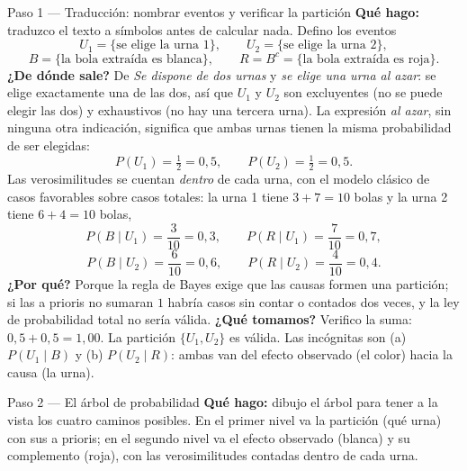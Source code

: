 \documentclass[11pt]{article}
\begin{document}
\begin{sol}

\begin{paso}{Paso 1 --- Traducción: nombrar eventos y verificar la partición}
\textbf{Qué hago:} traduzco el texto a símbolos antes de calcular nada. Defino los eventos
\[
U_1=\{\text{se elige la urna 1}\},\qquad U_2=\{\text{se elige la urna 2}\},
\]
\[
B=\{\text{la bola extraída es blanca}\},\qquad R=B^{c}=\{\text{la bola extraída es roja}\}.
\]
\textbf{¿De dónde sale?} De \emph{Se dispone de dos urnas} y \emph{se elige una urna al azar}: se elige exactamente una de las dos, así que $U_1$ y $U_2$ son excluyentes (no se puede elegir las dos) y exhaustivos (no hay una tercera urna). La expresión \emph{al azar}, sin ninguna otra indicación, significa que ambas urnas tienen la misma probabilidad de ser elegidas:
\[
P(U_1)=\tfrac12=0,5,\qquad P(U_2)=\tfrac12=0,5.
\]
Las verosimilitudes se cuentan \emph{dentro} de cada urna, con el modelo clásico de casos favorables sobre casos totales: la urna 1 tiene $3+7=10$ bolas y la urna 2 tiene $6+4=10$ bolas,
\[
P(B\mid U_1)=\frac{3}{10}=0,3,\qquad P(R\mid U_1)=\frac{7}{10}=0,7,
\]
\[
P(B\mid U_2)=\frac{6}{10}=0,6,\qquad P(R\mid U_2)=\frac{4}{10}=0,4.
\]
\textbf{¿Por qué?} Porque la regla de Bayes exige que las causas formen una partición; si las a prioris no sumaran $1$ habría casos sin contar o contados dos veces, y la ley de probabilidad total no sería válida.
\textbf{¿Qué tomamos?} Verifico la suma: $0,5+0,5=1,00$. La partición $\{U_1,U_2\}$ es válida. Las incógnitas son (a) $P(U_1\mid B)$ y (b) $P(U_2\mid R)$: ambas van del efecto observado (el color) hacia la causa (la urna).
\end{paso}

\begin{paso}{Paso 2 --- El árbol de probabilidad}
\textbf{Qué hago:} dibujo el árbol para tener a la vista los cuatro caminos posibles. En el primer nivel va la partición (qué urna) con sus a prioris; en el segundo nivel va el efecto observado (blanca) y su complemento (roja), con las verosimilitudes contadas dentro de cada urna.

\begin{center}
\shorthandoff{<>}
\end{center}
\end{paso}
\end{sol}
\end{document}
